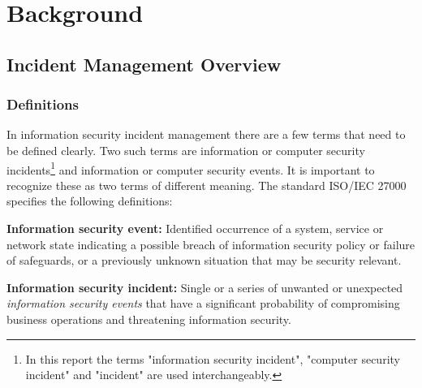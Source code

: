 \chapter{Background}

\section{Incident Management Overview}
\subsection{Definitions}
\label{sec:Definitions}
In information security incident management there are a few terms that need to be defined clearly. Two such terms are information or computer security incidents\footnote{In this report the terms "information security incident", "computer security incident" and "incident" are used interchangeably.} %
and information or computer security events. It is important to recognize these as two terms of different meaning. The standard \acs{ISO}/\acs{IEC} 27000 \cite{ISO/IEC27000} specifies the following definitions:

\textbf{Information security event:} Identified occurrence of a system, service or network state indicating a possible breach of information security policy or failure of safeguards, or a previously unknown situation that may be security relevant.

\textbf{Information security incident:} Single or a series of unwanted or unexpected \emph{information security events} that have a significant probability of compromising business operations and threatening information security.




